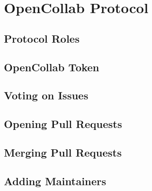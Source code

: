 \section{OpenCollab Protocol}

\subsection{Protocol Roles}

\subsection{OpenCollab Token}

\subsection{Voting on Issues}

\subsection{Opening Pull Requests}

\subsection{Merging Pull Requests}

\subsection{Adding Maintainers}
